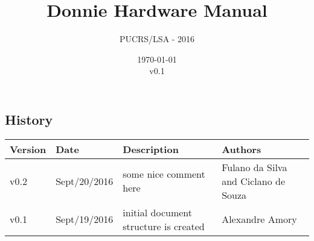 \documentclass[11pt,a4paper,final]{report}
\author{PUCRS/LSA - 2016}
\title{Donnie Hardware Manual}
\date{\today\\v0.1}
\begin{document}
\pagestyle{empty}

\maketitle 

\tableofcontents







\begin{landscape}
\chapter{History}
\label{sec:history}

\thispagestyle{empty}

\begin{tabular}{p{1.5cm}p{3cm}p{12cm}p{6cm}}
	\toprule
	 \textbf{Version} & \textbf{Date} & \textbf{Description}  & \textbf{Authors}\\
	\midrule
v0.2 & Sept/20/2016 & some nice comment here & Fulano da Silva and Ciclano de Souza  \\
v0.1 & Sept/19/2016 & initial document structure is created & Alexandre Amory  \\
	\bottomrule
\end{tabular}

\end{landscape}
\end{document}
